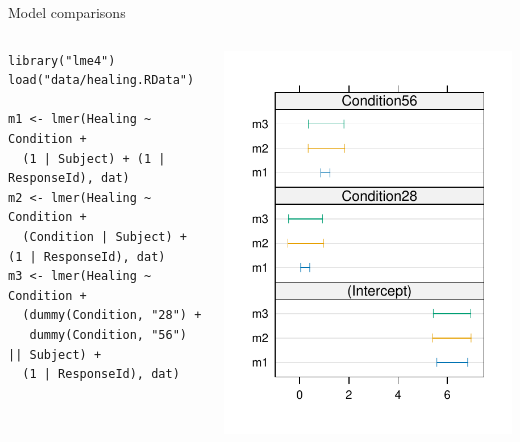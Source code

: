 \documentclass[aspectratio=169]{beamer}
\begin{document}
\begin{frame}[fragile]{Model comparisons}{\citep{Aungle2023}}
  \begin{columns}
    \begin{column}{.69\textwidth}
\begin{lstlisting}
library("lme4")
load("data/healing.RData")

m1 <- lmer(Healing ~ Condition +
  (1 | Subject) + (1 | ResponseId), dat)
m2 <- lmer(Healing ~ Condition +
  (Condition | Subject) + (1 | ResponseId), dat)
m3 <- lmer(Healing ~ Condition +
  (dummy(Condition, "28") +
   dummy(Condition, "56") || Subject) +
  (1 | ResponseId), dat)
\end{lstlisting}
    \end{column}
    \begin{column}{.35\textwidth}
      \includegraphics[scale=.6]{../figures/heal_ci}
    \end{column}
  \end{columns}
\end{frame}
\end{document}
